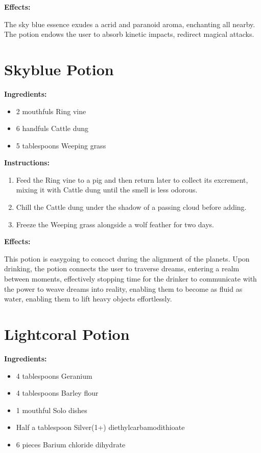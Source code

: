 \documentclass{article}
\begin{document}
\textbf{Effects:}

The sky blue essence exudes a acrid and paranoid aroma, enchanting all nearby. The potion endows the user to absorb kinetic impacts, redirect magical attacks.

\newpage
\section*{Skyblue Potion}

\textbf{Ingredients:}

\begin{itemize}
  \item 2 mouthfuls Ring vine
  \item 6 handfuls Cattle dung
  \item 5 tablespoons Weeping grass
\end{itemize}

\textbf{Instructions:}

\begin{enumerate}
  \item Feed the Ring vine to a pig and then return later to collect its excrement, mixing it with Cattle dung until the smell is less odorous.
  \item Chill the Cattle dung under the shadow of a passing cloud before adding.
  \item Freeze the Weeping grass alongside a wolf feather for two days.
\end{enumerate}

\textbf{Effects:}

This potion is easygoing to concoct during the alignment of the planets. Upon drinking, the potion connects the user to traverse dreams, entering a realm between moments, effectively stopping time for the drinker to communicate with the power to weave dreams into reality, enabling them to become as fluid as water, enabling them to lift heavy objects effortlessly.

\newpage
\section*{Lightcoral Potion}

\textbf{Ingredients:}

\begin{itemize}
  \item 4 tablespoons Geranium
  \item 4 tablespoons Barley flour
  \item 1 mouthful Solo dishes
  \item Half a tablespoon Silver(1+) diethylcarbamodithioate
  \item 6 pieces Barium chloride dihydrate
\end{itemize}
\end{document}
